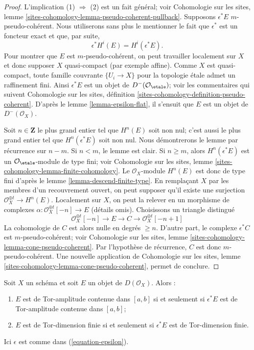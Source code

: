 \begin{proof}
L'implication (1) $\Rightarrow$ (2) est un fait g\'en\'eral; voir Cohomologie
sur les sites, lemme
\ref{sites-cohomology-lemma-pseudo-coherent-pullback}.
Supposons $\epsilon^*E$ $m$-pseudo-coh\'erent. Nous utiliserons sans plus le
mentionner le fait que $\epsilon^*$ est un foncteur exact et que, par suite,
$$
\epsilon^*H^i(E) = H^i(\epsilon^*E).
$$
Pour montrer que $E$ est $m$-pseudo-coh\'erent, on peut travailler localement
sur $X$ et donc supposer $X$ quasi-compact (par exemple affine).
Comme $X$ est quasi-compact, toute famille couvrante
$\{U_i \to X\}$ pour la topologie \'etale admet un raffinement fini. Ainsi
$\epsilon^*E$ est un objet de
$D^{-}(\mathcal{O}_\etale)$; voir les commentaires qui suivent Cohomologie
sur les sites, d\'efinition
\ref{sites-cohomology-definition-pseudo-coherent}.
D'apr\`es le lemme \ref{lemma-epsilon-flat}, il s'ensuit que $E$ est un objet
de $D^-(\mathcal{O}_X)$.

\medskip\noindent
Soit $n \in \mathbf{Z}$ le plus grand entier tel que $H^n(E)$ soit non nul;
c'est aussi le plus grand entier tel que $H^n(\epsilon^*E)$ soit non nul.
Nous d\'emontrerons le lemme par r\'ecurrence sur $n-m$.
Si $n < m$, le lemme est clair. Si $n \geq m$, alors
$H^n(\epsilon^*E)$ est un $\mathcal{O}_\etale$-module de type fini; voir
Cohomologie sur les sites, lemme
\ref{sites-cohomology-lemma-finite-cohomology}.
Le $\mathcal{O}_X$-module $H^n(E)$ est donc de type fini d'apr\`es le lemme
\ref{lemma-descend-finite-type}. En rempla\c{c}ant $X$ par les membres d'un
recouvrement ouvert, on peut supposer qu'il existe une surjection
$\mathcal{O}_X^{\oplus t} \to H^n(E)$. Localement sur $X$, on peut la relever
en un morphisme de complexes
$\alpha : \mathcal{O}_X^{\oplus t}[-n] \to E$ (d\'etails omis).
Choisissons un triangle distingu\'e
$$
\mathcal{O}_X^{\oplus t}[-n] \to E \to C \to \mathcal{O}_X^{\oplus t}[-n + 1]
$$
La cohomologie de $C$ est alors nulle en degr\'es $\geq n$. D'autre part, le
complexe $\epsilon^*C$ est $m$-pseudo-coh\'erent; voir Cohomologie sur les
sites, lemme \ref{sites-cohomology-lemma-cone-pseudo-coherent}.
Par l'hypoth\`ese de r\'ecurrence, $C$ est donc $m$-pseudo-coh\'erent. Une
nouvelle application de Cohomologie sur les sites, lemme
\ref{sites-cohomology-lemma-cone-pseudo-coherent}, permet de conclure.
\end{proof}

\begin{lemma}
\label{lemma-descend-tor-amplitude}
Soit $X$ un sch\'ema et soit $E$ un objet de $D(\mathcal{O}_X)$. Alors :
\begin{enumerate}
\item $E$ est de Tor-amplitude contenue dans $[a,b]$ si et seulement si
$\epsilon^*E$ est de Tor-amplitude contenue dans $[a,b]$;
\item $E$ est de Tor-dimension finie si et seulement si $\epsilon^*E$ est de
Tor-dimension finie.
\end{enumerate}
Ici $\epsilon$ est comme dans (\ref{equation-epsilon}).
\end{lemma}

